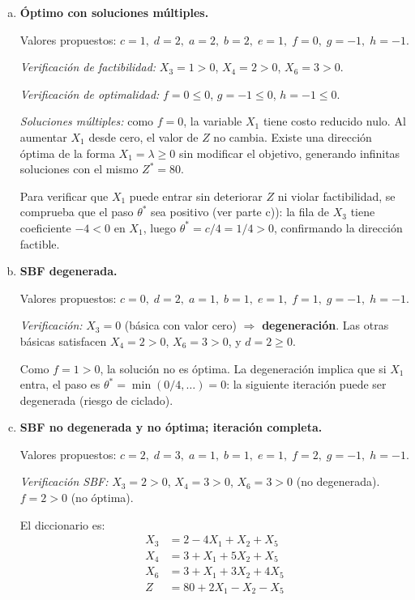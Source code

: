 \documentclass{article}
\begin{document}
\begin{enumerate}[a)]

\item \textbf{Óptimo con soluciones múltiples.}

Valores propuestos: $c=1,\;d=2,\;a=2,\;b=2,\;e=1,\;f=0,\;g=-1,\;h=-1$.

\textit{Verificación de factibilidad:} $X_3=1>0$, $X_4=2>0$, $X_6=3>0$. \checkmark

\textit{Verificación de optimalidad:} $f=0\leq0$, $g=-1\leq0$, $h=-1\leq0$. \checkmark

\textit{Soluciones múltiples:} como $f=0$, la variable $X_1$ tiene costo reducido nulo. Al aumentar $X_1$ desde cero, el valor de $Z$ no cambia. Existe una dirección óptima de la forma $X_1=\lambda\geq0$ sin modificar el objetivo, generando infinitas soluciones con el mismo $Z^*=80$.

Para verificar que $X_1$ puede entrar sin deteriorar $Z$ ni violar factibilidad, se comprueba que el paso $\theta^*$ sea positivo (ver parte c)): la fila de $X_3$ tiene coeficiente $-4<0$ en $X_1$, luego $\theta^*=c/4=1/4>0$, confirmando la dirección factible.

\item \textbf{SBF degenerada.}

Valores propuestos: $c=0,\;d=2,\;a=1,\;b=1,\;e=1,\;f=1,\;g=-1,\;h=-1$.

\textit{Verificación:} $X_3=0$ (básica con valor cero) $\Rightarrow$ \textbf{degeneración}. Las otras básicas satisfacen $X_4=2>0$, $X_6=3>0$, y $d=2\geq0$. \checkmark

Como $f=1>0$, la solución no es óptima. La degeneración implica que si $X_1$ entra, el paso es $\theta^*=\min(0/4,\ldots)=0$: la siguiente iteración puede ser degenerada (riesgo de ciclado).

\item \textbf{SBF no degenerada y no óptima; iteración completa.}

Valores propuestos: $c=2,\;d=3,\;a=1,\;b=1,\;e=1,\;f=2,\;g=-1,\;h=-1$.

\textit{Verificación SBF:} $X_3=2>0$, $X_4=3>0$, $X_6=3>0$ (no degenerada). $f=2>0$ (no óptima). \checkmark

El diccionario es:
$$\begin{aligned}
X_3 &= 2 - 4X_1 + X_2 + X_5 \\
X_4 &= 3 + X_1 + 5X_2 + X_5 \\
X_6 &= 3 + X_1 + 3X_2 + 4X_5 \\
Z   &= 80 + 2X_1 - X_2 - X_5
\end{aligned}$$


\end{enumerate}
\end{document}

